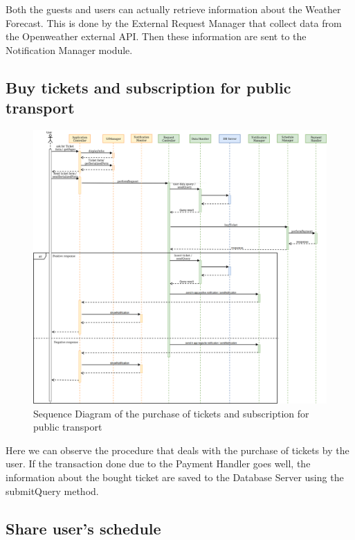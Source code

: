 \documentclass[numbers=noenddot, 12pt, a4paper, oneside]{scrbook}
\begin{document}
Both the guests and users can actually retrieve information about the Weather Forecast. This is done by the External Request Manager that collect data from the Openweather external API. Then these information are sent to the Notification Manager module.

\subsection*{Buy tickets and subscription for public transport}

\begin{figure}[H]
	\centering
	\includegraphics[width=1.1\textwidth,angle=-0]{images/Goal5}
	\caption{Sequence Diagram of the purchase of tickets and subscription for public transport}
\end{figure}

Here we can observe the procedure that deals with the purchase of tickets by the user. If the transaction done due to the Payment Handler goes well, the information about the bought ticket are saved to the Database Server using the submitQuery method.

\subsection*{Share user's schedule}
\end{document}
